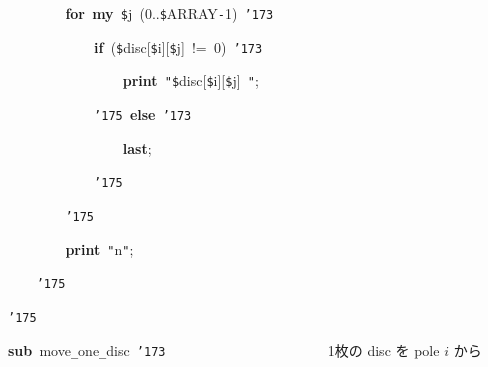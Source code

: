\documentclass[a4paper,10pt]{article}
\def\mc{\relax}
\begin{document}
\noindent
\mbox{}{\tt\mc \ }{\tt\mc \ }{\tt\mc \ }{\tt\mc \ }{\tt\mc \ }{\tt\mc \ }{\tt\mc \ }{\tt\mc \ }\textbf{for}{\tt\mc \ }\textbf{my}{\tt\mc \ }{\tt\$}j{\tt\mc \ }(0..{\tt\$}ARRAY{\tt -}1){\tt\mc \ }{\tt\char'173}

\noindent
\mbox{}{\tt\mc \ }{\tt\mc \ }{\tt\mc \ }{\tt\mc \ }{\tt\mc \ }{\tt\mc \ }{\tt\mc \ }{\tt\mc \ }{\tt\mc \ }{\tt\mc \ }{\tt\mc \ }{\tt\mc \ }\textbf{if}{\tt\mc \ }({\tt\$}disc[{\tt\$}i][{\tt\$}j]{\tt\mc \ }!={\tt\mc \ }0){\tt\mc \ }{\tt\char'173}

\noindent
\mbox{}{\tt\mc \ }{\tt\mc \ }{\tt\mc \ }{\tt\mc \ }{\tt\mc \ }{\tt\mc \ }{\tt\mc \ }{\tt\mc \ }{\tt\mc \ }{\tt\mc \ }{\tt\mc \ }{\tt\mc \ }{\tt\mc \ }{\tt\mc \ }{\tt\mc \ }{\tt\mc \ }\textbf{print}{\tt\mc \ }{\tt "}{\tt\$}disc[{\tt\$}i][{\tt\$}j]{\tt\mc \ }{\tt "};

\noindent
\mbox{}{\tt\mc \ }{\tt\mc \ }{\tt\mc \ }{\tt\mc \ }{\tt\mc \ }{\tt\mc \ }{\tt\mc \ }{\tt\mc \ }{\tt\mc \ }{\tt\mc \ }{\tt\mc \ }{\tt\mc \ }{\tt\char'175}{\tt\mc \ }\textbf{else}{\tt\mc \ }{\tt\char'173}

\noindent
\mbox{}{\tt\mc \ }{\tt\mc \ }{\tt\mc \ }{\tt\mc \ }{\tt\mc \ }{\tt\mc \ }{\tt\mc \ }{\tt\mc \ }{\tt\mc \ }{\tt\mc \ }{\tt\mc \ }{\tt\mc \ }{\tt\mc \ }{\tt\mc \ }{\tt\mc \ }{\tt\mc \ }\textbf{last};

\noindent
\mbox{}{\tt\mc \ }{\tt\mc \ }{\tt\mc \ }{\tt\mc \ }{\tt\mc \ }{\tt\mc \ }{\tt\mc \ }{\tt\mc \ }{\tt\mc \ }{\tt\mc \ }{\tt\mc \ }{\tt\mc \ }{\tt\char'175}

\noindent
\mbox{}{\tt\mc \ }{\tt\mc \ }{\tt\mc \ }{\tt\mc \ }{\tt\mc \ }{\tt\mc \ }{\tt\mc \ }{\tt\mc \ }{\tt\char'175}

\noindent
\mbox{}{\tt\mc \ }{\tt\mc \ }{\tt\mc \ }{\tt\mc \ }{\tt\mc \ }{\tt\mc \ }{\tt\mc \ }{\tt\mc \ }\textbf{print}{\tt\mc \ }{\tt "}{\tt{}}n{\tt "};

\noindent
\mbox{}{\tt\mc \ }{\tt\mc \ }{\tt\mc \ }{\tt\mc \ }{\tt\char'175}

\noindent
\mbox{}{\tt\char'175}

\noindent
\mbox{}\hfill

\noindent
\mbox{}\textbf{sub}{\tt\mc \ }move{\tt\_}one{\tt\_}disc{\tt\mc \ }{\tt\char'173}{\tt\mc \ }{\tt\mc \ }{\tt\mc \ }{\tt\mc \ }{\tt\mc \ }{\tt\mc \ }{\tt\mc \ }{\tt\mc \ }{\tt\mc \ }{\tt\mc \ }{\tt\mc \ }{\tt\mc \ }{\tt\mc \ }{\tt\mc \ }{\tt\mc \ }{\tt\mc \ }{\tt\mc \ }{\tt\mc \ }{\tt\mc \ }{\tt\mc \ }{\tt\mc \ }\rm\mc {\tt\#} \ 1枚の disc を pole $i$ から\hfill 
\tt\mc 
\end{document}
